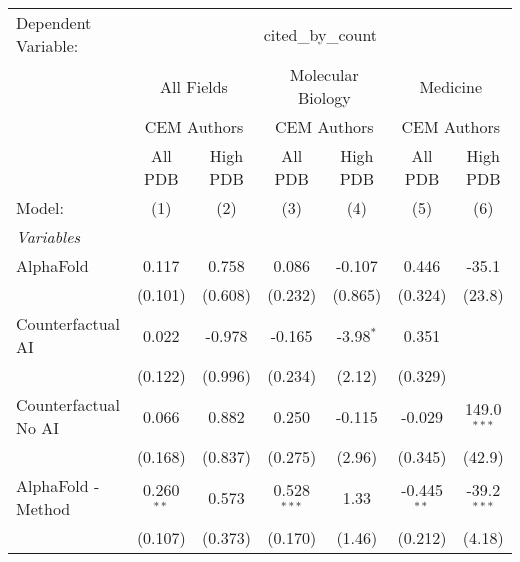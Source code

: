 \begingroup
\centering
\begin{tabular}{lcccccc}
   \tabularnewline \midrule \midrule
   Dependent Variable: & \multicolumn{6}{c}{cited\_by\_count}\\
 & \multicolumn{2}{c}{All Fields} & \multicolumn{2}{c}{Molecular Biology} & \multicolumn{2}{c}{Medicine} \\
\cmidrule(lr){2-3} \cmidrule(lr){4-5} \cmidrule(lr){6-7}
 & \multicolumn{2}{c}{CEM Authors} & \multicolumn{2}{c}{CEM Authors} & \multicolumn{2}{c}{CEM Authors} \\
\cmidrule(lr){2-3} \cmidrule(lr){4-5} \cmidrule(lr){6-7}
 & \multicolumn{1}{c}{All PDB} & \multicolumn{1}{c}{High PDB} & \multicolumn{1}{c}{All PDB} & \multicolumn{1}{c}{High PDB} & \multicolumn{1}{c}{All PDB} & \multicolumn{1}{c}{High PDB} \\
\cmidrule(lr){2-2} \cmidrule(lr){3-3} \cmidrule(lr){4-4} \cmidrule(lr){5-5} \cmidrule(lr){6-6} \cmidrule(lr){7-7}
   Model:                                                     & (1)            & (2)     & (3)           & (4)         & (5)           & (6)\\  
   \midrule
   \emph{Variables}\\
   AlphaFold                                                  & 0.117          & 0.758   & 0.086         & -0.107      & 0.446         & -35.1\\   
                                                              & (0.101)        & (0.608) & (0.232)       & (0.865)     & (0.324)       & (23.8)\\   
   Counterfactual AI                                          & 0.022          & -0.978  & -0.165        & -3.98$^{*}$ & 0.351         &   \\   
                                                              & (0.122)        & (0.996) & (0.234)       & (2.12)      & (0.329)       &   \\   
   Counterfactual No AI                                       & 0.066          & 0.882   & 0.250         & -0.115      & -0.029        & 149.0$^{***}$\\   
                                                              & (0.168)        & (0.837) & (0.275)       & (2.96)      & (0.345)       & (42.9)\\   
   AlphaFold - Method                                         & 0.260$^{**}$   & 0.573   & 0.528$^{***}$ & 1.33        & -0.445$^{**}$ & -39.2$^{***}$\\   
                                                              & (0.107)        & (0.373) & (0.170)       & (1.46)      & (0.212)       & (4.18)\\   

\end{tabular}
